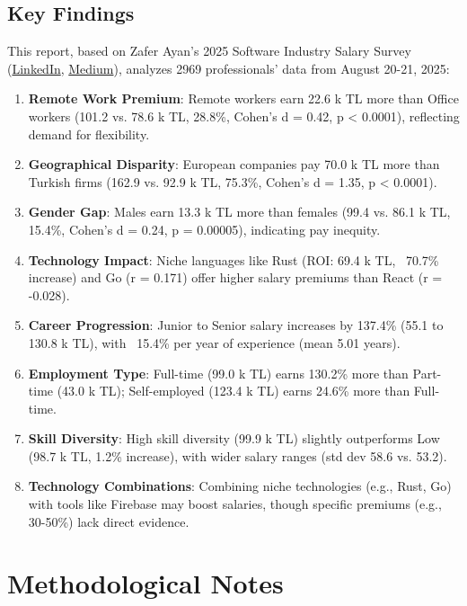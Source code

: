 \documentclass[12pt,a4paper]{article}
\begin{document}
\subsection{Key Findings}
This report, based on Zafer Ayan's 2025 Software Industry Salary Survey (\href{https://www.linkedin.com/posts/zaferayan_geleneksel-maa%C5%9F-anketi-buyrun-httpslnkdin-activity-7363866008664629248-7YcQ}{LinkedIn}, \href{https://zaferayan.medium.com/2025-a%C4%9Fustos-detayl%C4%B1-maa%C5%9F-anketi-98446d71920a}{Medium}), analyzes 2969 professionals' data from August 20-21, 2025:
	\begin{enumerate}
		\item \textbf{Remote Work Premium}: Remote workers earn 22.6 k TL more than Office workers (101.2 vs. 78.6 k TL, 28.8\%, Cohen's d = 0.42, p < 0.0001), reflecting demand for flexibility.
		\item \textbf{Geographical Disparity}: European companies pay 70.0 k TL more than Turkish firms (162.9 vs. 92.9 k TL, 75.3\%, Cohen's d = 1.35, p < 0.0001).
		\item \textbf{Gender Gap}: Males earn 13.3 k TL more than females (99.4 vs. 86.1 k TL, 15.4\%, Cohen's d = 0.24, p = 0.00005), indicating pay inequity.
		\item \textbf{Technology Impact}: Niche languages like Rust (ROI: 69.4 k TL, ~70.7\% increase) and Go (r = 0.171) offer higher salary premiums than React (r = -0.028).
		\item \textbf{Career Progression}: Junior to Senior salary increases by 137.4\% (55.1 to 130.8 k TL), with ~15.4\% per year of experience (mean 5.01 years).
		\item \textbf{Employment Type}: Full-time (99.0 k TL) earns 130.2\% more than Part-time (43.0 k TL); Self-employed (123.4 k TL) earns 24.6\% more than Full-time.
		\item \textbf{Skill Diversity}: High skill diversity (99.9 k TL) slightly outperforms Low (98.7 k TL, 1.2\% increase), with wider salary ranges (std dev 58.6 vs. 53.2).
		\item \textbf{Technology Combinations}: Combining niche technologies (e.g., Rust, Go) with tools like Firebase may boost salaries, though specific premiums (e.g., 30-50\%) lack direct evidence.
	\end{enumerate}

    \section{Methodological Notes}
	
\end{document}
